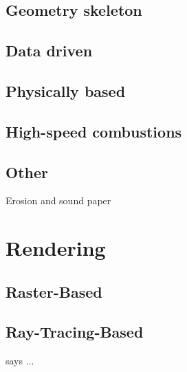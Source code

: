 \subsection{Geometry skeleton}

\subsection{Data driven}

\subsection{Physically based}

\subsection{High-speed combustions}

\subsection{Other}
	Erosion and sound paper




\section{Rendering}
\label{sec:rendering}


\subsection{Raster-Based}
\label{sec:raster_based}


\subsection{Ray-Tracing-Based}
\label{sec:ray_tracing_based}


\cite{Pegoraro:2006} says ...